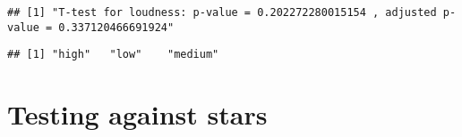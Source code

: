 \documentclass[
]{article}
\newenvironment{Shaded}{\begin{snugshade}}{\end{snugshade}}
\newcommand{\DecValTok}[1]{\textcolor[rgb]{0.00,0.00,0.81}{#1}}
\newcommand{\FunctionTok}[1]{\textcolor[rgb]{0.00,0.00,0.00}{#1}}
\newcommand{\NormalTok}[1]{#1}
\newcommand{\SpecialCharTok}[1]{\textcolor[rgb]{0.00,0.00,0.00}{#1}}
\newcommand{\StringTok}[1]{\textcolor[rgb]{0.31,0.60,0.02}{#1}}
\begin{document}
\begin{Shaded}
\end{Shaded}

\begin{verbatim}
## [1] "T-test for loudness: p-value = 0.202272280015154 , adjusted p-value = 0.337120466691924"
\end{verbatim}

\begin{Shaded}
\end{Shaded}

\begin{verbatim}
## [1] "high"   "low"    "medium"
\end{verbatim}

\hypertarget{testing-against-stars-2}{%
\section{Testing against stars}\label{testing-against-stars-2}}
\end{document}
